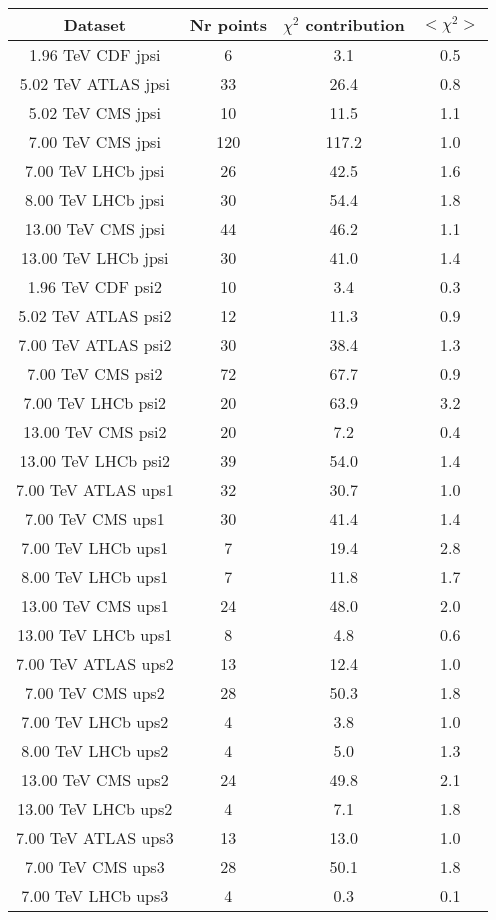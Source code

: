 \begin{table}[h!]
\centering
\begin{tabular}{c|c|c|c}
Dataset & Nr points & $\chi^2$ contribution & $<\chi^2>$ \\
\hline
1.96 TeV CDF jpsi & 6 & 3.1 & 0.5 \\
5.02 TeV ATLAS jpsi & 33 & 26.4 & 0.8 \\
5.02 TeV CMS jpsi & 10 & 11.5 & 1.1 \\
7.00 TeV CMS jpsi & 120 & 117.2 & 1.0 \\
7.00 TeV LHCb jpsi & 26 & 42.5 & 1.6 \\
8.00 TeV LHCb jpsi & 30 & 54.4 & 1.8 \\
13.00 TeV CMS jpsi & 44 & 46.2 & 1.1 \\
13.00 TeV LHCb jpsi & 30 & 41.0 & 1.4 \\
1.96 TeV CDF psi2 & 10 & 3.4 & 0.3 \\
5.02 TeV ATLAS psi2 & 12 & 11.3 & 0.9 \\
7.00 TeV ATLAS psi2 & 30 & 38.4 & 1.3 \\
7.00 TeV CMS psi2 & 72 & 67.7 & 0.9 \\
7.00 TeV LHCb psi2 & 20 & 63.9 & 3.2 \\
13.00 TeV CMS psi2 & 20 & 7.2 & 0.4 \\
13.00 TeV LHCb psi2 & 39 & 54.0 & 1.4 \\
7.00 TeV ATLAS ups1 & 32 & 30.7 & 1.0 \\
7.00 TeV CMS ups1 & 30 & 41.4 & 1.4 \\
7.00 TeV LHCb ups1 & 7 & 19.4 & 2.8 \\
8.00 TeV LHCb ups1 & 7 & 11.8 & 1.7 \\
13.00 TeV CMS ups1 & 24 & 48.0 & 2.0 \\
13.00 TeV LHCb ups1 & 8 & 4.8 & 0.6 \\
7.00 TeV ATLAS ups2 & 13 & 12.4 & 1.0 \\
7.00 TeV CMS ups2 & 28 & 50.3 & 1.8 \\
7.00 TeV LHCb ups2 & 4 & 3.8 & 1.0 \\
8.00 TeV LHCb ups2 & 4 & 5.0 & 1.3 \\
13.00 TeV CMS ups2 & 24 & 49.8 & 2.1 \\
13.00 TeV LHCb ups2 & 4 & 7.1 & 1.8 \\
7.00 TeV ATLAS ups3 & 13 & 13.0 & 1.0 \\
7.00 TeV CMS ups3 & 28 & 50.1 & 1.8 \\
7.00 TeV LHCb ups3 & 4 & 0.3 & 0.1 \\

\end{tabular}
\end{table}
